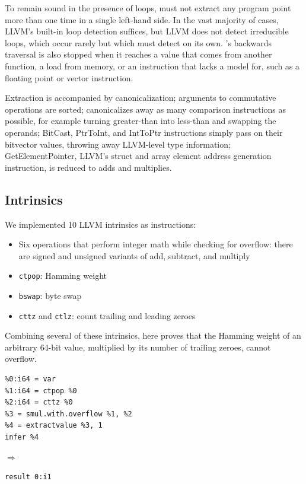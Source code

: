 To remain sound in the presence of loops, \tool{} must not extract any program
point more than one time in a single left-hand side.
%
In the vast majority of cases, LLVM's built-in loop detection suffices, but LLVM
does not detect irreducible loops, which occur rarely but which \tool{} must
detect on its own.
%
\tool{}'s backwards traversal is also stopped when it reaches a value
that comes from another function, a load from memory, or an
instruction that \tool{} lacks a model for, such as a floating point
or vector instruction.

Extraction is accompanied by canonicalization; arguments to
commutative operations are sorted; \tool{} canonicalizes away as many
comparison instructions as possible, for example turning greater-than
into less-than and swapping the operands; BitCast, PtrToInt, and
IntToPtr instructions simply pass on their bitvector values, throwing
away LLVM-level type information; GetElementPointer, LLVM's struct and
array element address generation instruction, is reduced to adds and
multiplies.


\subsection{Intrinsics}

We implemented 10 LLVM intrinsics as \tool{} instructions:
\begin{itemize}
\item
  Six operations that perform integer math while checking for
  overflow: there are signed and unsigned variants of add, subtract,
  and multiply
\item
  \texttt{ctpop}: Hamming weight
\item
  \texttt{bswap}: byte swap
\item
  \texttt{cttz} and \texttt{ctlz}: count trailing and leading zeroes
\end{itemize}

Combining several of these intrinsics, here \tool{} proves that the
Hamming weight of an arbitrary 64-bit value, multiplied by its number
of trailing zeroes, cannot overflow.

{\small\begin{verbatim}
%0:i64 = var
%1:i64 = ctpop %0
%2:i64 = cttz %0
%3 = smul.with.overflow %1, %2
%4 = extractvalue %3, 1
infer %4
\end{verbatim}}
$\Rightarrow$
{\small\begin{verbatim}
result 0:i1
\end{verbatim}}

